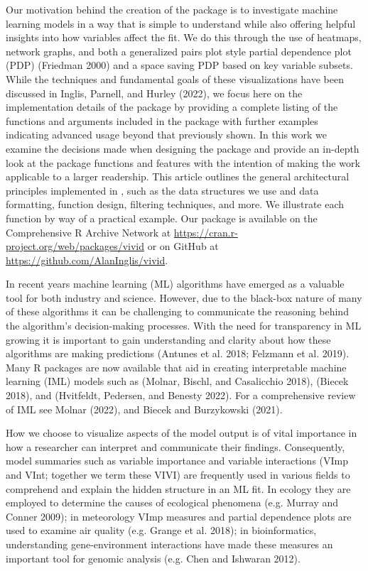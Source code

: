 Our motivation behind the creation of the  package is to investigate machine learning
models in a way that is simple to understand while also offering helpful
insights into how variables affect the fit. We do this through the use
of heatmaps, network graphs, and both a generalized pairs plot style
partial dependence plot (PDP) (Friedman 2000) and a space saving PDP based
on key variable subsets. While the techniques and fundamental goals of
these visualizations have been discussed in Inglis, Parnell, and Hurley (2022), we
focus here on the implementation details of the package by providing a
complete listing of the functions and arguments included in the 
package with further examples indicating advanced usage beyond that
previously shown. In this work we examine the decisions made when
designing the package and provide an in-depth look at the package
functions and features with the intention of making the work applicable
to a larger readership. This article outlines the general architectural
principles implemented in , such as the data structures we use and data
formatting, function design, filtering techniques, and more. We
illustrate each function by way of a practical example. Our package is
available on the Comprehensive R Archive Network at
\url{https://cran.r-project.org/web/packages/vivid} or on GitHub at
\url{https://github.com/AlanInglis/vivid}.

In recent years machine learning (ML) algorithms have emerged as a
valuable tool for both industry and science. However, due to the
black-box nature of many of these algorithms it can be challenging to
communicate the reasoning behind the algorithm's decision-making
processes. With the need for transparency in ML growing it is important
to gain understanding and clarity about how these algorithms are making
predictions (Antunes et al. 2018; Felzmann et al. 2019). Many R
packages are now available that aid in creating interpretable machine
learning (IML) models such as  (Molnar, Bischl, and Casalicchio 2018),  (Biecek 2018), and
 (Hvitfeldt, Pedersen, and Benesty 2022). For a
comprehensive review of IML see Molnar (2022), and
Biecek and Burzykowski (2021).

How we choose to visualize aspects of the model output is of vital
importance in how a researcher can interpret and communicate their
findings. Consequently, model summaries such as variable importance and
variable interactions (VImp and VInt; together we term these VIVI) are
frequently used in various fields to comprehend and explain the hidden
structure in an ML fit. In ecology they are employed to determine the
causes of ecological phenomena (e.g. Murray and Conner 2009); in meteorology
VImp measures and partial dependence plots are used to examine air
quality (e.g. Grange et al. 2018); in bioinformatics, understanding
gene-environment interactions have made these measures an important tool
for genomic analysis (e.g. Chen and Ishwaran 2012).

